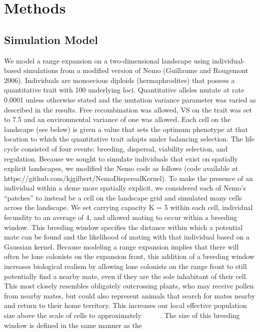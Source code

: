 \section{Methods}

\subsection{Simulation Model}
We model a range expansion on a two-dimensional landscape using individual-based simulations from a modified version of Nemo (Guillaume and Rougemont 2006). Individuals are monoecious diploids (hermaphrodites) that possess a quantitative trait with 100 underlying loci. Quantitative alleles mutate at rate 0.0001 unless otherwise stated and the mutation variance parameter was varied as described in the results. Free recombination was allowed, VS on the 
trait was set to 7.5 and an environmental variance of one was allowed. Each cell on the landscape (see below) is given a value that sets the optimum phenotype at that location to which the quantitative trait adapts under balancing selection. The life cycle consisted of four events: breeding, dispersal, viability selection, and regulation. 
Because we sought to simulate individuals that exist on spatially explicit landscapes, we modified 
the Nemo code as follows (code available at https://github.com/kjgilbert/NemoDispersalKernel). 
To make the presence of an individual within a deme more spatially explicit, we considered each 
of Nemo’s “patches” to instead be a cell on the landscape grid and simulated many cells across 
the landscape. We set carrying capacity K = 5 within each cell, individual fecundity to an 
average of 4, and allowed mating to occur within a breeding window. This breeding window 
specifies the distance within which a potential mate can be found and the likelihood of 
mating with that individual based on a Gaussian kernel. Because modeling a range expansion 
implies that there will often be lone colonists on the expansion front, this addition of a 
breeding window increases biological realism by allowing lone colonists on the range front 
to still potentially find a nearby mate, even if they are the sole inhabitant of their cell. 
This most closely resembles obligately outcrossing plants, who may receive pollen from nearby 
mates, but could also represent animals that search for mates nearby and return to their home 
territory. This increases our local effective population size above the scale of cells to 
approximately    ~~~~ . The size of this breeding window is defined in the same manner as the 
